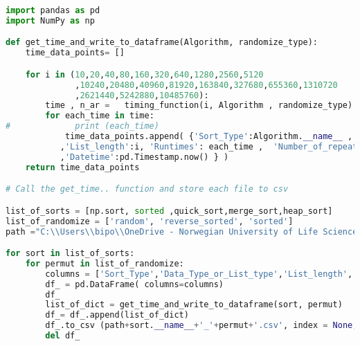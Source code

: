 \documentclass[sigconf, nonacm, natbib, screen, balance=False]{acmart}
\begin{document}
\begin{listing}
  \caption{Call timeit function and save data to .csv}
  \label{call time_it function}
\begin{lstlisting}[language=Python]
import pandas as pd
import NumPy as np

def get_time_and_write_to_dataframe(Algorithm, randomize_type):
    time_data_points= []

    for i in (10,20,40,80,160,320,640,1280,2560,5120
              ,10240,20480,40960,81920,163840,327680,655360,1310720
              ,2621440,5242880,10485760):
        time , n_ar =   timing_function(i, Algorithm , randomize_type) 
        for each_time in time:
#             print (each_time)
            time_data_points.append( {'Sort_Type':Algorithm.__name__ , 'Data_Type_or_List_type':randomize_type
           ,'List_length':i, 'Runtimes': each_time ,  'Number_of_repeatitions':n_ar
           ,'Datetime':pd.Timestamp.now() } )
    return time_data_points  

# Call the get_time.. function and store each file to csv

list_of_sorts = [np.sort, sorted ,quick_sort,merge_sort,heap_sort]
list_of_randomize = ['random', 'reverse_sorted', 'sorted']
path ="C:\\Users\\bipo\\OneDrive - Norwegian University of Life Sciences\\termpaper01\\plots_and_data\\csvs\\_20191120\\"

for sort in list_of_sorts:
    for permut in list_of_randomize:
        columns = ['Sort_Type','Data_Type_or_List_type','List_length','Runtimes','Number_of_repeatitions','Datetime']
        df_ = pd.DataFrame( columns=columns)
        df_
        list_of_dict = get_time_and_write_to_dataframe(sort, permut)
        df_= df_.append(list_of_dict)
        df_.to_csv (path+sort.__name__+'_'+permut+'.csv', index = None, header=True)
        del df_
\end{lstlisting}
\end{listing}
\end{document}
